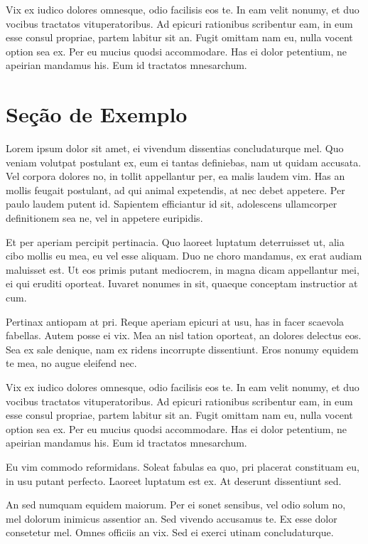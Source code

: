 \documentclass[
	12pt,				%
	openright,			%
	oneside,			%
	a4paper,			%
	english,			%
	french,				%
	spanish,			%
	brazil,				%
	]{abntex2}
\begin{document}
Vix ex iudico dolores omnesque, odio facilisis eos te. In eam velit nonumy, et duo vocibus tractatos vituperatoribus. Ad epicuri rationibus scribentur eam, in eum esse consul propriae, partem labitur sit an. Fugit omittam nam eu, nulla vocent option sea ex. Per eu mucius quodsi accommodare. Has ei dolor petentium, ne apeirian mandamus his. Eum id tractatos mnesarchum.

\section{Seção de Exemplo}
\label{sec: exemplo}

Lorem ipsum dolor sit amet, ei vivendum dissentias concludaturque mel. Quo veniam volutpat postulant ex, eum ei tantas definiebas, nam ut quidam accusata. Vel corpora dolores no, in tollit appellantur per, ea malis laudem vim. Has an mollis feugait postulant, ad qui animal expetendis, at nec debet appetere. Per paulo laudem putent id. Sapientem efficiantur id sit, adolescens ullamcorper definitionem sea ne, vel in appetere euripidis.

Et per aperiam percipit pertinacia. Quo laoreet luptatum deterruisset ut, alia cibo mollis eu mea, eu vel esse aliquam. Duo ne choro mandamus, ex erat audiam maluisset est. Ut eos primis putant mediocrem, in magna dicam appellantur mei, ei qui eruditi oporteat. Iuvaret nonumes in sit, quaeque conceptam instructior at cum.

Pertinax antiopam at pri. Reque aperiam epicuri at usu, has in facer scaevola fabellas. Autem posse ei vix. Mea an nisl tation oporteat, an dolores delectus eos. Sea ex sale denique, nam ex ridens incorrupte dissentiunt. Eros nonumy equidem te mea, no augue eleifend nec.

Vix ex iudico dolores omnesque, odio facilisis eos te. In eam velit nonumy, et duo vocibus tractatos vituperatoribus. Ad epicuri rationibus scribentur eam, in eum esse consul propriae, partem labitur sit an. Fugit omittam nam eu, nulla vocent option sea ex. Per eu mucius quodsi accommodare. Has ei dolor petentium, ne apeirian mandamus his. Eum id tractatos mnesarchum.

Eu vim commodo reformidans. Soleat fabulas ea quo, pri placerat constituam eu, in usu putant perfecto. Laoreet luptatum est ex. At deserunt dissentiunt sed.

An sed numquam equidem maiorum. Per ei sonet sensibus, vel odio solum no, mel dolorum inimicus assentior an. Sed vivendo accusamus te. Ex esse dolor consetetur mel. Omnes officiis an vix. Sed ei exerci utinam concludaturque.
\end{document}
